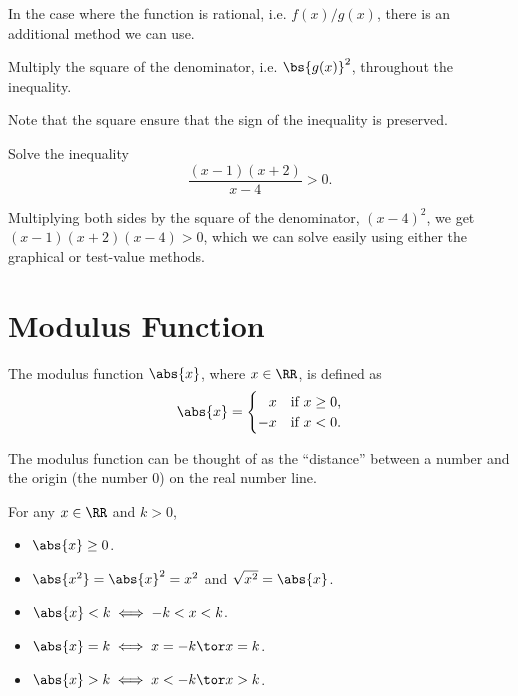 In the case where the function is rational, i.e. $f(x)/g(x)$, there is an additional method we can use.
\begin{recipe}
    Multiply the square of the denominator, i.e. $\bs{g(x)}^2$, throughout the inequality.
\end{recipe}
Note that the square ensure that the sign of the inequality is preserved.

\begin{sample}
    Solve the inequality \[\frac{(x-1)(x + 2)}{x - 4} > 0.\]
\end{sample}
\begin{sampans}
    Multiplying both sides by the square of the denominator, $(x-4)^2$, we get $(x-1)(x+2)(x-4) > 0$, which we can solve easily using either the graphical or test-value methods.
\end{sampans}

\section{Modulus Function}

\begin{definition}
    The modulus function $\abs{x}$, where $x \in \RR$, is defined as \[\abs{x} = \begin{cases}
        \phantom{-}x & \text{if $x \geq 0$,}\\
        -x & \text{if $x < 0$.}
    \end{cases}\]
\end{definition}

The modulus function can be thought of as the ``distance'' between a number and the origin (the number 0) on the real number line.

\begin{fact}
    For any $x \in \RR$ and $k > 0$,
    \begin{itemize}
        \item $\abs{x} \geq 0$.
        \item $\abs{x^2} = \abs{x}^2 = x^2$ and $\sqrt{x^2} = \abs{x}$.
        \item $\abs{x} < k \iff -k < x < k$.
        \item $\abs{x} = k \iff x = -k \tor x = k$.
        \item $\abs{x} > k \iff x < -k \tor x > k$.
    \end{itemize}
\end{fact}